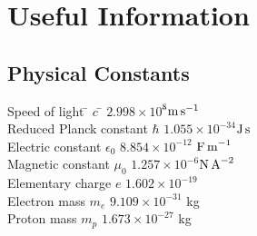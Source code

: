 \chapter{Useful Information}

\section{Physical Constants}
\begin{tabbing}
Speed of light \mbox{\hspace{3cm}}\= $c$\mbox{\hspace{1cm}} \= $2.998\times 10^{8}$\mbox{\hspace{1cm}}\=${\rm m\,s}^{-1}$\\
Reduced Planck constant \> $\hbar$ \> $1.055\times 10^{-34}$\>${\rm J\,s}$\\
Electric constant\> $\epsilon_0$ \> $8.854\times 10^{-12}$\>  ${\rm F\,m}^{-1}$\\
Magnetic constant\> $\mu_0$ \> $1.257\times 10^{-6}$\>${\rm N\,A}^{-2}$\\
Elementary charge\> $e$\> $1.602\times 10^{-19}$\\
Electron mass\> $m_e$\> $9.109\times 10^{-31}$\> {\rm kg}\\
Proton mass\> $m_p$ \> $1.673\times 10^{-27}$\> {\rm kg}
\end{tabbing}

